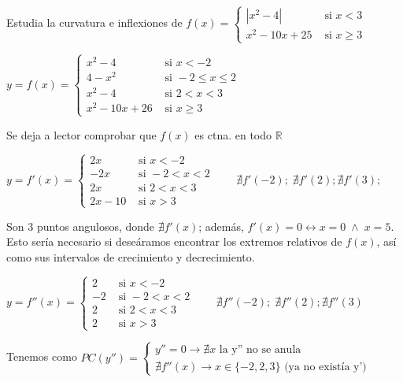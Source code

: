 	\begin{ejem} Estudia la curvatura e inflexiones de $f(x)=\begin{cases}
		|x^2-4| & \mbox{ si } x<3 \\
		x^2-10x+25 & \mbox{ si } x\ge 3
		\end{cases}$
		
	$y=f(x)=\begin{cases}
	x^2-4 & \mbox{ si } x<-2 \\
	4-x^2 & \mbox{ si } -2\le x \le 2 \\
	x^2-4 & \mbox{ si } 2<x<3 \\
	x^2-10x+26 & \mbox{ si } x\ge 3
	\end{cases} $ 
	
	Se deja a lector comprobar que $f(x)$ es ctna. en todo $\mathbb R$	
	
	$y=f'(x)=\begin{cases}
	2x & \mbox{ si } x<-2 \\
	-2x & \mbox{ si } -2< x < 2 \\
	2x & \mbox{ si } 2<x<3 \\
	2x-10 & \mbox{ si } x> 3
	\end{cases} \qquad \nexists f'(-2); \; \nexists f'(2); \nexists f'(3);$  
	
	Son 3 puntos angulosos, donde $\nexists f'(x)$; además, $f'(x)=0 \leftrightarrow x=0 \; \wedge \; x=5$. Esto sería necesario si deseáramos encontrar los extremos relativos de $f(x)$, así como sus intervalos de crecimiento y decrecimiento.
	
	$y=f''(x)=\begin{cases}
	2 & \mbox{ si } x<-2 \\
	-2 & \mbox{ si } -2< x < 2 \\
	2 & \mbox{ si } 2<x<3 \\
	2 & \mbox{ si } x> 3
	\end{cases} \qquad \nexists f''(-2); \; \nexists f''(2); \nexists f''(3)$  
	
	Tenemos como $PC(y'')=\begin{cases}
	y''=0 \to \nexists x \mbox{ la y'' no se anula}  \\
	\nexists f''(x) \to x \in \{-2,2,3\} \mbox{ (ya no existía y') }
	\end{cases}
	$
		

\end{ejem}
